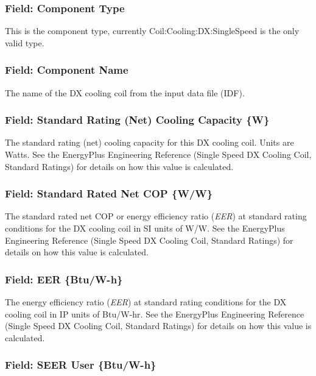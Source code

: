 \subsubsection{Field: Component Type}\label{field-component-type-3}

This is the component type, currently Coil:Cooling:DX:SingleSpeed is the only valid type.

\subsubsection{Field: Component Name}\label{field-component-name-3}

The name of the DX cooling coil from the input data file (IDF).

\subsubsection{Field: Standard Rating (Net) Cooling Capacity \{W\}}\label{field-standard-rating-net-cooling-capacity-w}

The standard rating (net) cooling capacity for this DX cooling coil. Units are Watts. See the EnergyPlus Engineering Reference (Single Speed DX Cooling Coil, Standard Ratings) for details on how this value is calculated.

\subsubsection{Field: Standard Rated Net COP \{W/W\}}\label{field-standard-rated-net-cop-ww}

The standard rated net COP or energy efficiency ratio (\emph{EER}) at standard rating conditions for the DX cooling coil in SI units of W/W. See the EnergyPlus Engineering Reference (Single Speed DX Cooling Coil, Standard Ratings) for details on how this value is calculated.

\subsubsection{Field: EER \{Btu/W-h\}}\label{field-eer-btuw-h}

The energy efficiency ratio (\emph{EER}) at standard rating conditions for the DX cooling coil in IP units of Btu/W-hr. See the EnergyPlus Engineering Reference (Single Speed DX Cooling Coil, Standard Ratings) for details on how this value is calculated.

\subsubsection{Field: SEER User \{Btu/W-h\}}\label{field-seer-btuw-h}

